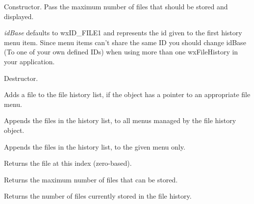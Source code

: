 Constructor. Pass the maximum number of files that should be stored and
displayed.

{\it idBase} defaults to wxID\_FILE1 and represents the id given to the first
history menu item.  Since menu items can't share the same ID you should change
idBase (To one of your own defined IDs) when using more than one wxFileHistory
in your application.


\label{wxfilehistorydtor}


Destructor.


\label{wxfilehistoryaddfiletohistory}


Adds a file to the file history list, if the object has a pointer to an appropriate file menu.


\label{wxfilehistoryaddfilestomenu}

\label{wxfilehistoryaddfilestomenu}

Appends the files in the history list, to all menus managed by the file history object.


Appends the files in the history list, to the given menu only.


\label{wxfilehistorygethistoryfile}


Returns the file at this index (zero-based).


\label{wxfilehistorygetmaxfiles}


Returns the maximum number of files that can be stored.


\label{wxfilehistorygetcount}


Returns the number of files currently stored in the file history.


\label{wxfilehistoryload}

